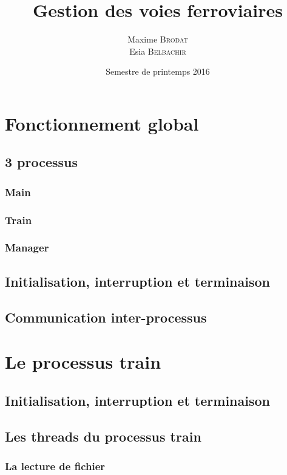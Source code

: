 \documentclass[a4paper,12pt]{article}
\title{Gestion des voies ferroviaires}{Projet de LO41}
\author{Maxime \textsc{Brodat} \\ Esia \textsc{Belbachir}}
\date{Semestre de printemps 2016}
\begin{document}
\maketitlepage

\tableofcontents
\pagebreak

\neverindent

\section{Fonctionnement global}

\subsection{3 processus}

\subsubsection{Main}

\subsubsection{Train}

\subsubsection{Manager}

\subsection{Initialisation, interruption et terminaison}

\subsection{Communication inter-processus}

\section{Le processus train}

\subsection{Initialisation, interruption et terminaison}

\subsection{Les threads du processus train}

\subsubsection{La lecture de fichier}
\end{document}
